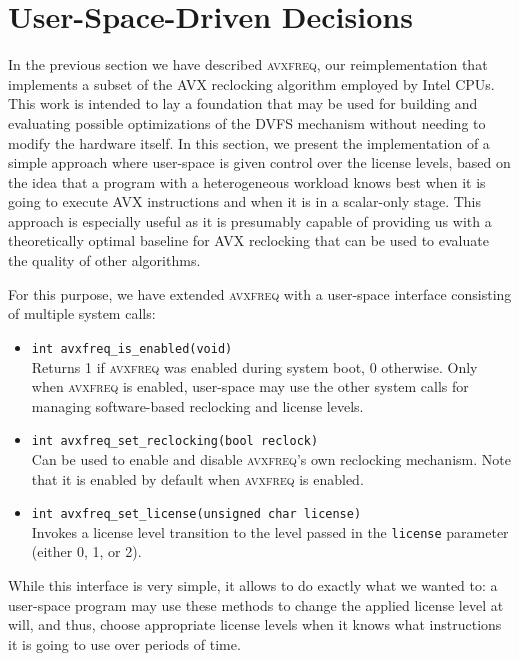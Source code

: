 
\section{User-Space-Driven Decisions}

In the previous section we have described \textsc{avxfreq}, our reimplementation that implements a subset of the \gls{AVX} reclocking algorithm employed by Intel \glspl{CPU}. This work is intended to lay a foundation that may be used for building and evaluating possible optimizations of the \gls{DVFS} mechanism without needing to modify the hardware itself. In this section, we present the implementation of a simple approach where user-space is given control over the license levels, based on the idea that a program with a heterogeneous workload knows best when it is going to execute \gls{AVX} instructions and when it is in a scalar-only stage. This approach is especially useful as it is presumably capable of providing us with a theoretically optimal baseline for \gls{AVX} reclocking that can be used to evaluate the quality of other algorithms.

For this purpose, we have extended \textsc{avxfreq} with a user-space interface consisting of multiple system calls:

\begin{itemize}
	\item \texttt{int avxfreq_is_enabled(void)} \\
		Returns 1 if \textsc{avxfreq} was enabled during system boot, 0 otherwise. Only when \textsc{avxfreq} is enabled, user-space may use the other system calls for managing software-based reclocking and license levels.
	\item \texttt{int avxfreq_set_reclocking(bool reclock)} \\
		Can be used to enable and disable \textsc{avxfreq}'s own reclocking mechanism. Note that it is enabled by default when \textsc{avxfreq} is enabled.
	\item \texttt{int avxfreq_set_license(unsigned char license)} \\
		Invokes a license level transition to the level passed in the \texttt{license} parameter (either 0, 1, or 2).
\end{itemize}

While this interface is very simple, it allows to do exactly what we wanted to: a user-space program may use these methods to change the applied license level at will, and thus, choose appropriate license levels when it knows what instructions it is going to use over periods of time.